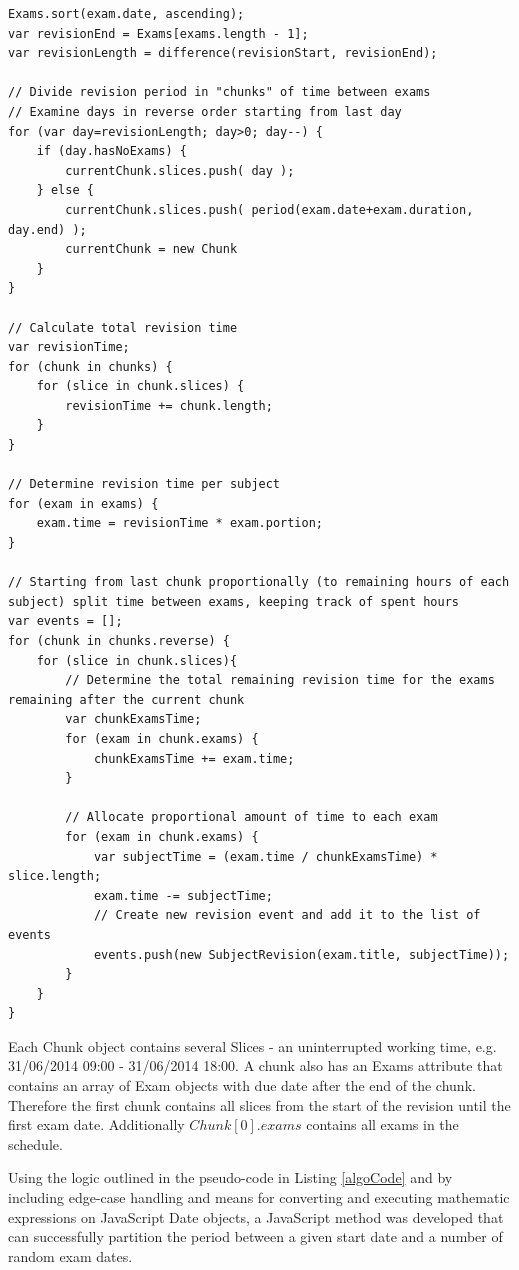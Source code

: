 \documentclass[bsc,frontabs,twoside,singlespacing,parskip]{infthesis}     %
\begin{document}
		\begin{lstlisting}[caption="SmartRevise scheduling algorithm", label=algoCode]
Exams.sort(exam.date, ascending);
var revisionEnd = Exams[exams.length - 1];
var revisionLength = difference(revisionStart, revisionEnd);

// Divide revision period in "chunks" of time between exams
// Examine days in reverse order starting from last day
for (var day=revisionLength; day>0; day--) {
	if (day.hasNoExams) {
		currentChunk.slices.push( day );
	} else {
		currentChunk.slices.push( period(exam.date+exam.duration, day.end) );
		currentChunk = new Chunk
	}
}

// Calculate total revision time
var revisionTime;
for (chunk in chunks) {
	for (slice in chunk.slices) {
		revisionTime += chunk.length;
	}
}

// Determine revision time per subject
for (exam in exams) {
	exam.time = revisionTime * exam.portion;
}

// Starting from last chunk proportionally (to remaining hours of each subject) split time between exams, keeping track of spent hours
var events = [];
for (chunk in chunks.reverse) {
	for (slice in chunk.slices){
		// Determine the total remaining revision time for the exams remaining after the current chunk
		var chunkExamsTime;
		for (exam in chunk.exams) {
			chunkExamsTime += exam.time;
		}

		// Allocate proportional amount of time to each exam
		for (exam in chunk.exams) {
			var subjectTime = (exam.time / chunkExamsTime) * slice.length;
			exam.time -= subjectTime;
			// Create new revision event and add it to the list of events
			events.push(new SubjectRevision(exam.title, subjectTime));
		}
	}
}

		\end{lstlisting}


		Each Chunk object contains several Slices - an uninterrupted working time, e.g. 31/06/2014 09:00 - 31/06/2014 18:00. A chunk also has an Exams attribute that contains an array of Exam objects with due date after the end of the chunk. Therefore the first chunk contains all slices from the start of the revision until the first exam date. Additionally $ Chunk[0].exams $ contains all exams in the schedule.

		Using the logic outlined in the pseudo-code in Listing \ref{algoCode} and by including edge-case handling and means for converting and executing mathematic expressions on JavaScript Date objects, a JavaScript method was developed that can successfully partition the period between a given start date and a number of random exam dates.
\end{document}
